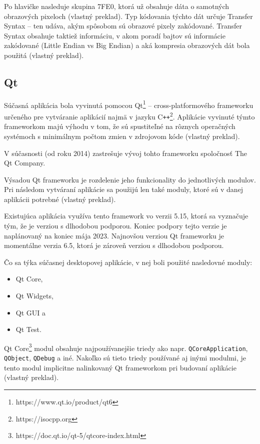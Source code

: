 Po hlavičke nasleduje skupina 7FE0, ktorá už obsahuje dáta o samotných obrazových pixeloch \cite{Varma_2012} (vlastný preklad). Typ kódovania týchto dát určuje Transfer Syntax -- ten udáva, akým spôsobom sú obrazové pixely zakódované. Transfer Syntax obsahuje taktiež informáciu, v akom poradí bajtov sú informácie zakódované (Little Endian vs Big Endian) a aká kompresia obrazových dát bola použitá \cite{dicom_transfer_syntax} (vlastný preklad).

\subsection {Qt}
Súčasná aplikácia bola vyvinutá pomocou Qt\footnote{https://www.qt.io/product/qt6} -- cross-platformového frameworku určeného pre vytváranie aplikácií najmä v jazyku C\texttt{++}\footnote{https://isocpp.org}. Aplikácie vyvinuté týmto frameworkom majú výhodu v tom, že sú spustiteľné na rôznych operačných systémoch s minimálnym počtom zmien v zdrojovom kóde \cite{qt_description} (vlastný preklad).

V súčasnosti (od roku 2014) zastrešuje vývoj tohto frameworku spoločnosť The Qt Company.

\clearpage

Výsadou Qt frameworku je rozdelenie jeho funkcionality do jednotlivých modulov. Pri následom vytváraní aplikácie sa použijú len také moduly, ktoré sú v danej aplikácii potrebné \cite{qt_description} (vlastný preklad).

Existujúca aplikácia využíva tento framework vo verzii 5.15, ktorá sa vyznačuje tým, že je verziou s dlhodobou podporou. Koniec podpory tejto verzie je naplánovaný na koniec mája 2023. Najnovšou verziou Qt frameworku je momentálne verzia 6.5, ktorá je zároveň verziou s dlhodobou podporou.

Čo sa týka súčasnej desktopovej aplikácie, v nej boli použité nasledovné moduly: 
\begin{itemize}
\item {Qt Core,}
\item {Qt Widgets,}
\item {Qt GUI a}
\item {Qt Test.}
\end{itemize}

Qt Core\footnote{https://doc.qt.io/qt-5/qtcore-index.html} modul obsahuje najpoužívanejšie triedy ako napr. \texttt{QCoreApplication}, \texttt{QObject}, \texttt{QDebug} a iné. Nakoľko sú tieto triedy používané aj inými modulmi, je tento modul implicitne nalinkovaný Qt frameworkom pri budovaní aplikácie \cite{qtcore_description} (vlastný preklad).

